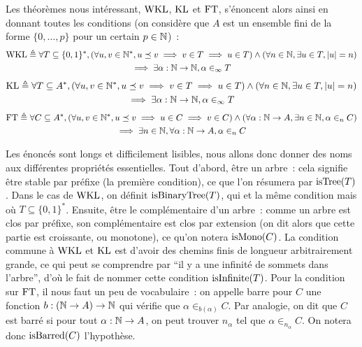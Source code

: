 \documentclass{article}
\begin{document}
Les théorèmes nous intéressant, $\mathrm{WKL}$, $\mathrm{KL}$ et $\mathrm{FT}$, s'énoncent alors ainsi en donnant toutes les conditions (on considère que $A$ est un ensemble fini de la forme $\{0,\ldots,p\}$ pour un certain $p \in \mathbb{N}$)~:
\begin{multline*}
    \mathrm{WKL} \triangleq \forall T \subseteq\{0,1\}^*, (\forall u,v\in \mathbb{N}^*, u\preceq v \implies v \in T \implies u \in T)\land (\forall n \in \mathbb{N}, \exists u \in T, |u| = n)\\ \implies \exists \alpha : \mathbb{N}\to\mathbb{N}, \alpha \in_\infty T
\end{multline*}
\begin{multline*}
    \mathrm{KL} \triangleq \forall T \subseteq A^*, (\forall u,v\in \mathbb{N}^*, u\preceq v \implies v \in T \implies u \in T)\land (\forall n \in \mathbb{N}, \exists u \in T, |u| = n) \\ \implies \exists \alpha : \mathbb{N}\to\mathbb{N}, \alpha \in_\infty T
\end{multline*}
\begin{multline*}
    \mathrm{FT} \triangleq \forall C \subseteq A^*, (\forall u,v\in \mathbb{N}^*, u\preceq v \implies u \in C \implies v \in C) \land (\forall \alpha : \mathbb{N}\to A, \exists n \in \mathbb{N}, \alpha \in_n C) \\\implies \exists n \in \mathbb{N}, \forall \alpha : \mathbb{N}\to A, \alpha \in_n C
\end{multline*}

Les énoncés sont longs et difficilement lisibles, nous allons donc donner des noms aux différentes propriétés essentielles. Tout d'abord, être un arbre~: cela signifie être stable par préfixe (la première condition), ce que l'on résumera par $\mathrm{isTree}(T)$. Dans le cas de $\mathrm{WKL}$, on définit $\mathrm{isBinaryTree}(T)$, qui et la même condition mais où $T\subseteq\{0,1\}^*$. Ensuite, être le complémentaire d'un arbre~: comme un arbre est clos par préfixe, son complémentaire est clos par extension (on dit alors que cette partie est croissante, ou monotone), ce qu'on notera $\mathrm{isMono}(C)$. La condition commune à $\mathrm{WKL}$ et $\mathrm{KL}$ est d'avoir des chemins finis de longueur arbitrairement grande, ce qui peut se comprendre par ``il y a une infinité de sommets dans l'arbre'', d'où le fait de nommer cette condition $\mathrm{isInfinite}(T)$. Pour la condition sur $\mathrm{FT}$, il nous faut un peu de vocabulaire~: on appelle barre pour $C$ une fonction $b : (\mathbb{N} \to A) \to \mathbb{N}$ qui vérifie que $\alpha \in_{b(\alpha)} C$. Par analogie, on dit que $C$ est barré si pour tout $\alpha : \mathbb{N} \to A$, on peut trouver $n_\alpha$ tel que $\alpha \in_{n_\alpha} C$. On notera donc $\mathrm{isBarred}(C)$ l'hypothèse.
\end{document}
